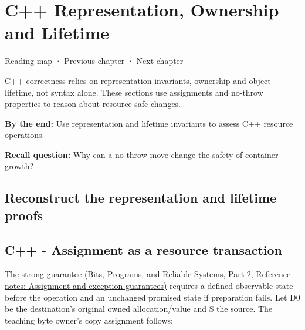 \chapter{C++ Representation, Ownership and Lifetime}\label{03-visual-computing-i-ch018-c-representation-ownership-and-lifetime}\hypertarget{03-visual-computing-i-ch018}{}\label{stagechapter:03-visual-computing-i-ch018}

\hypertarget{03-visual-computing-i-ch018-c-representation-ownership-and-lifetime}{}

\hyperref[volume-reading-map]{Reading map} · \hyperref[03-visual-computing-i-ch017-build-test-and-reproduce-the-program]{Previous chapter} · \hyperref[06-engine-ii-ch042]{Next chapter}

C++ correctness relies on representation invariants, ownership and object lifetime, not syntax alone. These sections use assignments and no-throw properties to reason about resource-safe changes.

\textbf{By the end:} Use representation and lifetime invariants to assess C++ resource operations.

\textbf{Recall question:} Why can a no-throw move change the safety of container growth?

\section{Reconstruct the representation and lifetime proofs}\label{03-visual-computing-i-ch018-reconstruct-the-representation-and-lifetime-proofs}

\hypertarget{03-visual-computing-i-ch018-reconstruct-the-representation-and-lifetime-proofs}{}

\section{C++ - Assignment as a resource transaction}\label{03-visual-computing-i-ch018-c---assignment-as-a-resource-transaction}

\hypertarget{03-visual-computing-i-ch018-c---assignment-as-a-resource-transaction}{}

The \href{../01-Bits-Programs-and-Reliable-Systems-P02/main.pdf\#nameddest=appendix-bea6beb5350f}{strong guarantee (Bits, Programs, and Reliable Systems, Part 2, Reference notes: Assignment and exception guarantees)} requires a defined observable state before the operation and an unchanged promised state if preparation fails. Let D0 be the destination's original owned allocation/value and S the source. The teaching byte owner's copy assignment follows:

